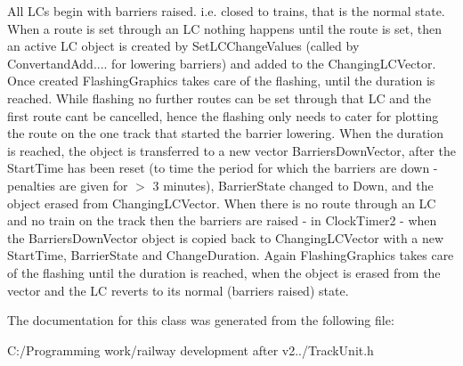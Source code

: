 All L\+Cs begin with barriers raised. i.\+e. closed to trains, that is the normal state. When a route is set through an LC nothing happens until the route is set, then an active LC object is created by Set\+L\+C\+Change\+Values (called by Convertand\+Add.... for lowering barriers) and added to the Changing\+L\+C\+Vector. Once created \textquotesingle{}Flashing\+Graphics\textquotesingle{} takes care of the flashing, until the duration is reached. While flashing no further routes can be set through that LC and the first route can\textquotesingle{}t be cancelled, hence the flashing only needs to cater for plotting the route on the one track that started the barrier lowering. When the duration is reached, the object is transferred to a new vector Barriers\+Down\+Vector, after the Start\+Time has been reset (to time the period for which the barriers are down -\/ penalties are given for $>$ 3 minutes), Barrier\+State changed to Down, and the object erased from Changing\+L\+C\+Vector. When there is no route through an LC and no train on the track then the barriers are raised -\/ in Clock\+Timer2 -\/ when the Barriers\+Down\+Vector object is copied back to Changing\+L\+C\+Vector with a new Start\+Time, Barrier\+State and Change\+Duration. Again Flashing\+Graphics takes care of the flashing until the duration is reached, when the object is erased from the vector and the LC reverts to its normal (barriers raised) state. 

The documentation for this class was generated from the following file\+:\begin{DoxyCompactItemize}
\item 
C\+:/\+Programming work/railway development after v2../Track\+Unit.\+h\end{DoxyCompactItemize}
